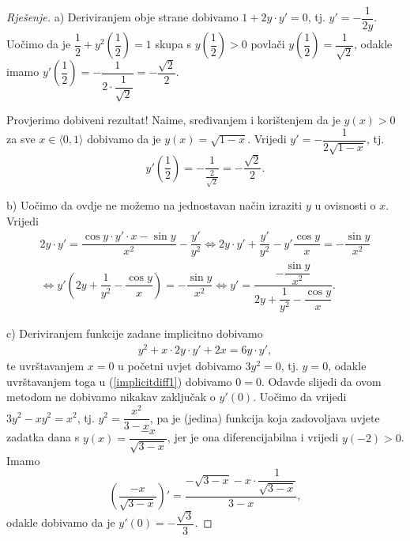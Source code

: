 \begin{proof}[Rješenje]
a) Deriviranjem obje strane dobivamo $1+2y\cdot y'=0$, tj. $y'=-\dfrac{1}{2y}$. Uočimo da je $\dfrac{1}{2}+y^2\left(\dfrac{1}{2}\right)=1$ skupa s $y\left(\dfrac{1}{2}\right)>0$ povlači $y\left(\dfrac{1}{2}\right)=\dfrac{1}{\sqrt{2}}$, odakle imamo $y'\left(\dfrac{1}{2}\right)=-\dfrac{1}{2\cdot \dfrac{1}{\sqrt{2}}}=-\dfrac{\sqrt{2}}{2}$.

Provjerimo dobiveni rezultat! Naime, sređivanjem i korištenjem da je $y(x)>0$ za sve $x\in \langle 0, 1\rangle$ dobivamo da je $y(x)=\sqrt{1-x}$. Vrijedi $y'=-\dfrac{1}{2\sqrt{1-x}}$, tj. $$y'\left(\dfrac{1}{2}\right)=-\dfrac{1}{\frac{2}{\sqrt{2}}}=-\dfrac{\sqrt{2}}{2}.$$

b) Uočimo da ovdje ne možemo na jednostavan način izraziti $y$ u ovisnosti o $x$. Vrijedi
\begin{gather*}
2y\cdot y'=\dfrac{\cos{y}\cdot y'\cdot x-\sin{y}}{x^2}-\dfrac{y'}{y^2}\Leftrightarrow 2y\cdot y'+\dfrac{y'}{y^2}-y'\dfrac{\cos{y}}{x}=-\dfrac{\sin{y}}{x^2}\\
\Leftrightarrow y'\left(2y+\dfrac{1}{y^2}-\dfrac{\cos{y}}{x}\right)=-\dfrac{\sin{y}}{x^2}\Leftrightarrow y'=\dfrac{-\dfrac{\sin{y}}{x^2}}{2y+\dfrac{1}{y^2}-\dfrac{\cos{y}}{x}}.
\end{gather*}

c) Deriviranjem funkcije zadane implicitno dobivamo
\begin{gather}
\label{implicitdiff1}
y^2+x\cdot 2y\cdot y'+2x=6y\cdot y',
\end{gather}
te uvrštavanjem $x=0$ u početni uvjet dobivamo $3y^2=0$, tj. $y=0$, odakle uvrštavanjem toga u (\ref{implicitdiff1}) dobivamo $0=0$. Odavde slijedi da ovom metodom ne dobivamo nikakav zaključak o $y'(0)$. Uočimo da vrijedi $3y^2-xy^2=x^2$, tj. $y^2=\dfrac{x^2}{3-x}$, pa je (jedina) funkcija koja zadovoljava uvjete zadatka dana s $y(x)=\dfrac{-x}{\sqrt{3-x}}$, jer je ona diferencijabilna i vrijedi $y(-2)>0$. Imamo
$$\left(\dfrac{-x}{\sqrt{3-x}}\right)'=\dfrac{-\sqrt{3-x}-x\cdot \dfrac{1}{\sqrt{3-x}}}{3-x},$$
odakle dobivamo da je $y'(0)=-\dfrac{\sqrt{3}}{3}$.
\end{proof}

